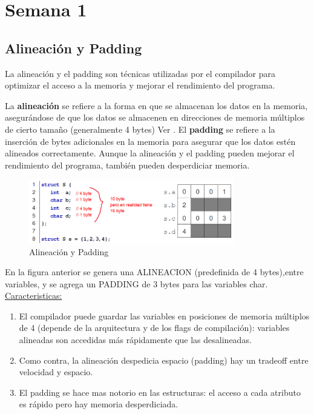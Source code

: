 \documentclass[../main.tex]{subfiles}
\begin{document}
\section{Semana 1} 
    \subsection{Alineación y Padding}
        La alineación y el padding son técnicas utilizadas por el compilador para optimizar el acceso a la memoria y mejorar el rendimiento del programa. 
        
        La \textbf{alineación} se refiere a la forma en que se almacenan los datos en la memoria, asegurándose de que los datos se almacenen en direcciones de memoria múltiplos de cierto tamaño (generalmente 4 bytes) Ver \cite{Alineación}. El \textbf{padding} se refiere a la inserción de bytes adicionales en la memoria para asegurar que los datos estén alineados correctamente. Aunque la alineación y el padding pueden mejorar el rendimiento del programa, también pueden desperdiciar memoria.
    
        \begin{figure}[htbp]
            \centering
            \includegraphics[width=0.8\textwidth]{../images/alineacion_padding.png}
            \caption{Alineación y Padding}
            \label{fig:alineacion}
        \end{figure}

        En la figura anterior se genera una ALINEACION (predefinida de 4 bytes),entre variables, y se agrega un PADDING de 3 bytes para las variables char. \\

        \underline{Caracteristicas:}
        \begin{enumerate}
            \item El compilador puede guardar las variables en posiciones de memoria múltiplos de 4 (depende de la arquitectura y de los flags de compilación): variables alineadas son accedidas más rápidamente que las desalineadas.
            \item Como contra, la alineación despedicia espacio (padding) hay un tradeoff entre velocidad y espacio.
            \item El padding se hace mas notorio en las estructuras: el acceso a cada atributo es rápido pero hay memoria desperdiciada.
        \end{enumerate}
\end{document}
